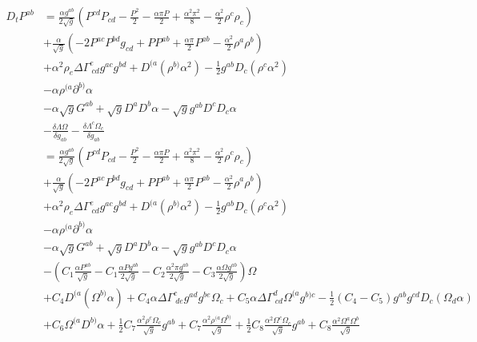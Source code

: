\documentclass{article}
\begin{document}
\begin{align*}
D_{t}P^{ab} & = \frac{\alpha g^{ab}}{2\sqrt{g}}\left(P^{cd}P_{cd} - \frac{P^{2}}{2} - \frac{\alpha \pi P}{2} + \frac{\alpha^{2}\pi^{2}}{8} - \frac{\alpha^{2}}{2}\rho^{c}\rho_{c}\right)\\
& + \frac{\alpha}{\sqrt{g}}\left(-2P^{ac}P^{bd}g_{cd} + PP^{ab} + \frac{\alpha \pi}{2}P^{ab} - \frac{\alpha^{2}}{2}\rho^{a}\rho^{b}\right)\\
& + \alpha^{2}\rho_{e}\Delta \Gamma^{e}_{~cd}g^{ac}g^{bd} + D^{(a}\left(\rho^{b)}\alpha^{2}\right) - \frac{1}{2}g^{ab}D_{c}\left(\rho^{c}\alpha^{2}\right)\\
& - \alpha \rho^{(a}\partial^{b)}\alpha\\
& - \alpha \sqrt{g}G^{ab} + \sqrt{g}D^{a}D^{b}\alpha - \sqrt{g}g^{ab}D^{c}D_{c}\alpha\\
& - \frac{\delta \Lambda \Omega}{\delta g_{ab}} - \frac{\delta \Lambda^{c}\Omega_{c}}{\delta g_{ab}}\\
& = \frac{\alpha g^{ab}}{2\sqrt{g}}\left(P^{cd}P_{cd} - \frac{P^{2}}{2} - \frac{\alpha \pi P}{2} + \frac{\alpha^{2}\pi^{2}}{8} - \frac{\alpha^{2}}{2}\rho^{c}\rho_{c}\right)\\
& + \frac{\alpha}{\sqrt{g}}\left(-2P^{ac}P^{bd}g_{cd} + PP^{ab} + \frac{\alpha \pi}{2}P^{ab} - \frac{\alpha^{2}}{2}\rho^{a}\rho^{b}\right)\\
& + \alpha^{2}\rho_{e}\Delta \Gamma^{e}_{~cd}g^{ac}g^{bd} + D^{(a}\left(\rho^{b)}\alpha^{2}\right) - \frac{1}{2}g^{ab}D_{c}\left(\rho^{c}\alpha^{2}\right)\\
& - \alpha \rho^{(a}\partial^{b)}\alpha\\
& - \alpha \sqrt{g}G^{ab} + \sqrt{g}D^{a}D^{b}\alpha - \sqrt{g}g^{ab}D^{c}D_{c}\alpha\\
& - \left(C_{1}\frac{\alpha P^{ab}}{\sqrt{g}} - C_{1}\frac{\alpha P g^{ab}}{2\sqrt{g}} - C_{2}\frac{\alpha^{2} \pi g^{ab}}{2\sqrt{g}} - C_{3}\frac{\alpha \Omega g^{ab}}{2\sqrt{g}}\right)\Omega\\
&  + C_{4}D^{(a}\left(\Omega^{b)}\alpha\right) + C_{4}\alpha \Delta \Gamma^{c}_{~de}g^{ad}g^{be}\Omega_{c} + C_{5}\alpha \Delta \Gamma^{d}_{~cd}\Omega^{(a}g^{b)c} - \frac{1}{2}\left(C_{4} - C_{5}\right)g^{ab}g^{cd}D_{c}\left(\Omega_{d}\alpha\right)\\
& + C_{6} \Omega^{(a}D^{b)}\alpha + \frac{1}{2}C_{7} \frac{\alpha^{2}\rho^{c}\Omega_{c}}{\sqrt{g}}g^{ab} + C_{7}\frac{\alpha^{2}\rho^{(a}\Omega^{b)}}{\sqrt{g}} + \frac{1}{2}C_{8}\frac{\alpha^{2}\Omega^{c}\Omega_{c}}{\sqrt{g}}g^{ab} + C_{8}\frac{\alpha^{2}\Omega^{a}\Omega^{b}}{\sqrt{g}}
\end{align*}
\end{document}
